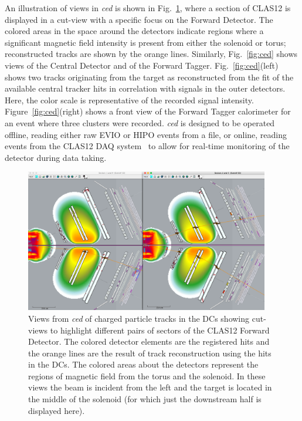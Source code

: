 An illustration of views in {\it ced} is shown in Fig.~\ref{fig:dcTracks}, where a section of CLAS12 is displayed in
a cut-view with a specific focus on the Forward Detector. The colored areas in the space around the detectors
indicate regions where a significant magnetic field intensity is present from either the solenoid or torus;
reconstructed tracks are shown by the orange lines. Similarly, Fig.~\ref{fig:ced} shows views of the Central
Detector and of the Forward Tagger. Fig.~\ref{fig:ced}(left) shows two tracks originating from the target as
reconstructed from the fit of the available central tracker hits in correlation with signals in the outer detectors.
Here, the color scale is representative of the recorded signal intensity. Figure~\ref{fig:ced}(right) shows a
front view of the Forward Tagger calorimeter for an event where three clusters were recorded. {\it ced} is
designed to be operated offline, reading either raw EVIO or HIPO events from a file, or online, reading events
from the CLAS12 DAQ system~\cite{daq-nim} to allow for real-time monitoring of the detector during data taking.

\begin{figure}
\centering
\includegraphics[width=0.95\textwidth]{pics/dcTrack3.png}
\caption{Views from {\it ced} of charged particle tracks in the DCs showing cut-views to highlight different pairs
  of sectors of the CLAS12 Forward Detector. The colored detector elements are the registered hits and the
  orange lines are the result of track reconstruction using the hits in the DCs. The colored areas about the
  detectors represent the regions of magnetic field from the torus and the solenoid. In these views the beam is
  incident from the left and the target is located in the middle of the solenoid (for which just the downstream half
  is displayed here).}
\label{fig:dcTracks}
\end{figure}

